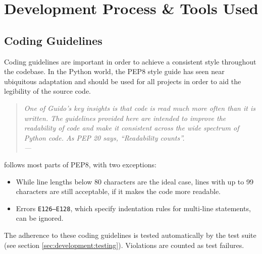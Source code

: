 
\chapter{Development Process \& Tools Used}

\label{ch:development}


\section{Coding Guidelines}


Coding guidelines are important in order to achieve a consistent style
throughout the codebase. In the Python world, the PEP8 style guide
\cite{pep8:2001} has seen near ubiquitous adaptation and should be used for all
projects in order to aid the legibility of the source code.

\begin{quote}{\slshape
One of Guido's key insights is that code is read much more often than it is
written. The guidelines provided here are intended to improve the readability of
code and make it consistent across the wide spectrum of Python code. As PEP 20
says, ``Readability counts''. \\ \medskip
---  \citep{pep8:2001}
}\end{quote}

\noindent \tangible{} follows most parts of PEP8, with two exceptions:

\begin{itemize}
	\item While line lengths below 80 characters are the ideal case, lines with up
		to 99 characters are still acceptable, if it makes the code more readable.
	\item Errors \texttt{E126--E128}, which specify indentation rules for
		multi-line statements, can be ignored.
\end{itemize}

\noindent The adherence to these coding guidelines is tested automatically by
the test suite (see section \ref{sec:development:testing}). Violations are
counted as test failures.

